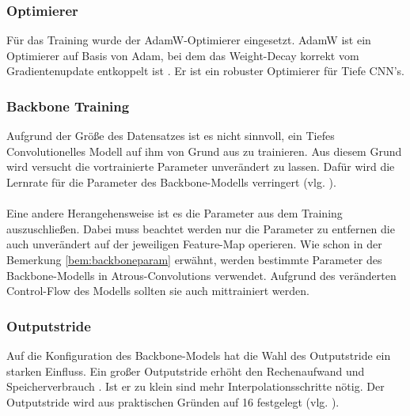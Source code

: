 \documentclass[12pt,DIV=15,BCOR=15mm,twoside,headsepline,abstract=true,listof=totoc,bibliography=totoc]{scrreprt}
\theoremstyle{remark}    %
\begin{document}
    \subsubsection{Optimierer}
    Für das Training wurde der AdamW-Optimierer eingesetzt. AdamW ist ein Optimierer auf Basis von Adam, bei dem das Weight-Decay korrekt vom 
    Gradientenupdate entkoppelt ist \cite{loshchilov2019decoupledweightdecayregularization}. Er ist ein robuster Optimierer für Tiefe \ac{CNN}'s. 
    
    \subsubsection{Backbone Training}
    Aufgrund der Größe des Datensatzes ist es nicht sinnvoll, ein Tiefes Convolutionelles Modell auf ihm von Grund aus zu trainieren. Aus diesem 
    Grund wird versucht die vortrainierte Parameter unverändert zu lassen. Dafür wird die Lernrate für die Parameter des Backbone-Modells 
    verringert (vlg. \cite{chen2017rethinkingatrousconvolutionsemantic}).\\\\
    Eine andere Herangehensweise ist es die Parameter aus dem Training auszuschließen. Dabei muss beachtet werden nur die Parameter zu entfernen die auch
    unverändert auf der jeweiligen Feature-Map operieren. Wie schon in der Bemerkung \ref{bem:backboneparam} erwähnt, werden bestimmte Parameter des 
    Backbone-Modells in Atrous-Convolutions verwendet. Aufgrund des veränderten Control-Flow des Modells sollten sie auch mittrainiert werden.
    \subsubsection{Outputstride}
    Auf die Konfiguration des Backbone-Models hat die Wahl des Outputstride ein starken Einfluss. Ein großer Outputstride erhöht den 
    Rechenaufwand und Speicherverbrauch \cite{chen2017rethinkingatrousconvolutionsemantic}. Ist er zu klein sind mehr Interpolationsschritte nötig.
    Der Outputstride wird aus praktischen Gründen auf 16 festgelegt (vlg. \cite{chen2017rethinkingatrousconvolutionsemantic}). 
\end{document}
